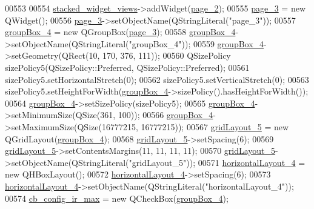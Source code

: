 \begin{DoxyCode}
00553 
00554         \hyperlink{a00027_a59e39bd3d716004e840a5be5dda18b96}{stacked\_widget\_views}->addWidget(\hyperlink{a00027_adcb6de4cebc6760fe319711f125010cc}{page\_2});
00555         \hyperlink{a00027_ac682cb2a9b686ca7c3d29771ad9ccb48}{page\_3} = \textcolor{keyword}{new} QWidget();
00556         \hyperlink{a00027_ac682cb2a9b686ca7c3d29771ad9ccb48}{page\_3}->setObjectName(QStringLiteral(\textcolor{stringliteral}{"page\_3"}));
00557         \hyperlink{a00027_ad8a919e5634add9c41bfc319cb9fd338}{groupBox\_4} = \textcolor{keyword}{new} QGroupBox(\hyperlink{a00027_ac682cb2a9b686ca7c3d29771ad9ccb48}{page\_3});
00558         \hyperlink{a00027_ad8a919e5634add9c41bfc319cb9fd338}{groupBox\_4}->setObjectName(QStringLiteral(\textcolor{stringliteral}{"groupBox\_4"}));
00559         \hyperlink{a00027_ad8a919e5634add9c41bfc319cb9fd338}{groupBox\_4}->setGeometry(QRect(10, 170, 376, 111));
00560         QSizePolicy sizePolicy5(QSizePolicy::Preferred, QSizePolicy::Preferred);
00561         sizePolicy5.setHorizontalStretch(0);
00562         sizePolicy5.setVerticalStretch(0);
00563         sizePolicy5.setHeightForWidth(\hyperlink{a00027_ad8a919e5634add9c41bfc319cb9fd338}{groupBox\_4}->sizePolicy().hasHeightForWidth());
00564         \hyperlink{a00027_ad8a919e5634add9c41bfc319cb9fd338}{groupBox\_4}->setSizePolicy(sizePolicy5);
00565         \hyperlink{a00027_ad8a919e5634add9c41bfc319cb9fd338}{groupBox\_4}->setMinimumSize(QSize(361, 100));
00566         \hyperlink{a00027_ad8a919e5634add9c41bfc319cb9fd338}{groupBox\_4}->setMaximumSize(QSize(16777215, 16777215));
00567         \hyperlink{a00027_a8731b71c513ff94baf59614807823c5d}{gridLayout\_5} = \textcolor{keyword}{new} QGridLayout(\hyperlink{a00027_ad8a919e5634add9c41bfc319cb9fd338}{groupBox\_4});
00568         \hyperlink{a00027_a8731b71c513ff94baf59614807823c5d}{gridLayout\_5}->setSpacing(6);
00569         \hyperlink{a00027_a8731b71c513ff94baf59614807823c5d}{gridLayout\_5}->setContentsMargins(11, 11, 11, 11);
00570         \hyperlink{a00027_a8731b71c513ff94baf59614807823c5d}{gridLayout\_5}->setObjectName(QStringLiteral(\textcolor{stringliteral}{"gridLayout\_5"}));
00571         \hyperlink{a00027_ae183387a7d233b437a637b403ba39ffd}{horizontalLayout\_4} = \textcolor{keyword}{new} QHBoxLayout();
00572         \hyperlink{a00027_ae183387a7d233b437a637b403ba39ffd}{horizontalLayout\_4}->setSpacing(6);
00573         \hyperlink{a00027_ae183387a7d233b437a637b403ba39ffd}{horizontalLayout\_4}->setObjectName(QStringLiteral(\textcolor{stringliteral}{"horizontalLayout\_4"}));
00574         \hyperlink{a00027_ae78fd3c777d081ab1ec1d0142bec3320}{cb\_config\_ir\_max} = \textcolor{keyword}{new} QCheckBox(\hyperlink{a00027_ad8a919e5634add9c41bfc319cb9fd338}{groupBox\_4});

\end{DoxyCode}

